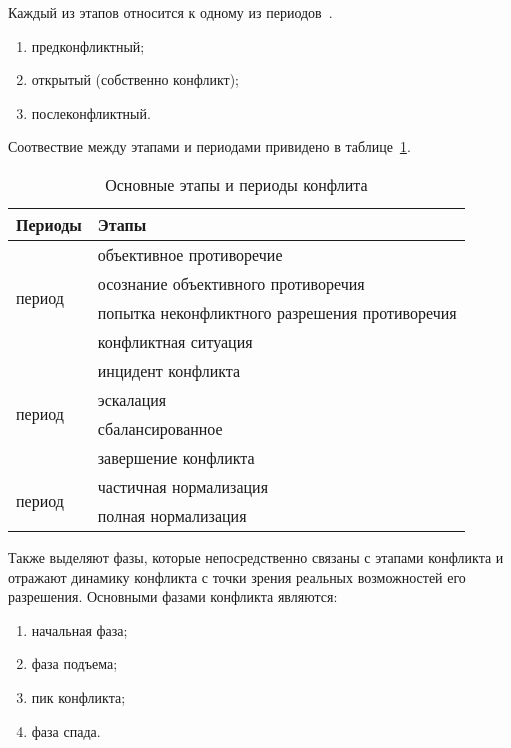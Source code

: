 Каждый из этапов относится к одному из периодов~\cite{book01}.
\begin{enumerate}[label=\arabic*)]
    \item предконфликтный;
    \item открытый (собственно конфликт);
    \item послеконфликтный.
\end{enumerate}

Соотвествие между этапами и периодами привидено в таблице~\ref{tab:01}.

\noindent
{
\captionsetup{format=hang,justification=raggedright,
              singlelinecheck=off,width=11cm}
\begin{longtable}[c]{|p{4.2cm}|p{6cm}|}
\caption{Основные этапы и периоды конфлита\label{tab:01}}\\
    \hline
    \bfseries Периоды & \bfseries Этапы \\
    \hline
    \multirow{4}{*}{\parbox[c]{4cm}{\vspace{1.5cm} период}}
          & объективное противоречие \\ \cline{2-2}
          & осознание объективного противоречия \\ \cline{2-2}
          & попытка неконфликтного разрешения противоречия \\ \cline{2-2}
          & конфликтная ситуация \\
    \hline
    \multirow{4}{*}{\parbox[c]{4cm}{\vspace{1cm} период}}
          & инцидент конфликта \\ \cline{2-2}
          & эскалация \\ \cline{2-2}
          & сбалансированное \\ \cline{2-2}
          & завершение конфликта \\
    \hline
    \multirow{2}{*}{\parbox[c]{4cm}{\vspace{0.9cm} период}}
          & частичная нормализация \\ \cline{2-2}
          & полная нормализация \\ \cline{2-2}
    \hline
\end{longtable}
}

Также выделяют фазы, которые непосредственно связаны с этапами конфликта и
отражают динамику конфликта с точки зрения реальных возможностей его
разрешения. Основными фазами конфликта являются:
\begin{enumerate}
    \item начальная фаза;
    \item фаза подъема;
    \item пик конфликта;
    \item фаза спада.
\end{enumerate}

